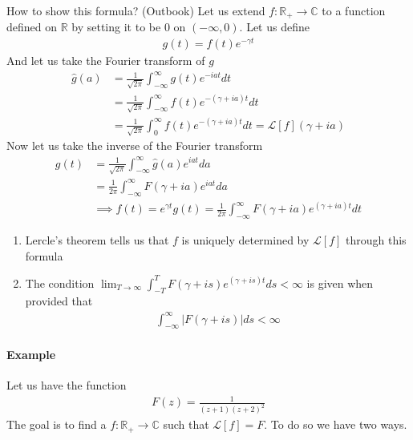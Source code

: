 \begin{parag}{How to show this formula? (Outbook)}
    Let us extend $f: \mathbb{R}_+ \to \mathbb{C}$ to a function defined on $ \mathbb{R}$ by setting it to be $0$ on $\left(-\infty, 0\right)$. Let us define 
	\begin{align*} 
		g\left(t\right) =  f\left(t\right)e^{-\gamma t}
	\end{align*}
	And let us take the Fourier transform of $g$
	\begin{align*} 
		\hat{g}\left(a\right) &= \frac{1}{\sqrt{2\pi}} \int_{-\infty}^{\infty}g\left(t\right)e^{-iat}dt \\
		&= \frac{1}{\sqrt{2\pi}}\int_{-\infty}^{\infty}f\left(t\right)e^{-\left(\gamma + ia\right)t}dt \\
		&= \frac{1}{\sqrt{2\pi}}\int_{0}^{\infty}f\left(t\right)e^{-\left(\gamma + ia\right)t}dt = \mathcal{L}\left[f\right]\left(\gamma + ia\right)
	\end{align*}
	Now let us take the inverse of the Fourier transform 
	\begin{align*} 
		g\left(t\right) &=  \frac{1}{\sqrt{2\pi}} \int_{-\infty}^{\infty}\hat{g}\left(a\right)e^{iat}da \\
		&= \frac{1}{2\pi} \int_{-\infty}^{\infty}F\left(\gamma + ia\right)e^{iat}da\\
		&\implies f\left(t\right) =  e^{\gamma t}g\left(t\right) = \frac{1}{2\pi}\int_{-\infty}^{\infty}F\left(\gamma + ia\right)e^{\left(\gamma + ia\right)t}dt
	\end{align*}
\end{parag}
\begin{framedremark}
	\begin{enumerate}
	    \item Lercle's theorem tells us that $f$ is uniquely determined by $\mathcal{L}\left[f\right]$ through this formula
	    \item The condition $\lim_{T \to \infty} \int_{-T}^{T}F\left(\gamma + is\right)e^{\left(\gamma + is\right)t}ds < \infty$ is given when provided that 
			\begin{align*} 
				\int_{-\infty}^{\infty}\left|F\left(\gamma + is\right)\right|ds < \infty
			\end{align*}
	\end{enumerate}


\end{framedremark}


\paragraph{Example}%
\label{par:ExampleInverse}
    Let us have the function 
	\begin{align*} 
		F\left(z\right) = \frac{1}{\left(z + 1\right)\left(z + 2\right)^2}
	\end{align*}
	The goal is to find a $f: \mathbb{R}_+ \to \mathbb{C}$ such that $\mathcal{L}\left[f\right] = F$. To do so we have two ways.

